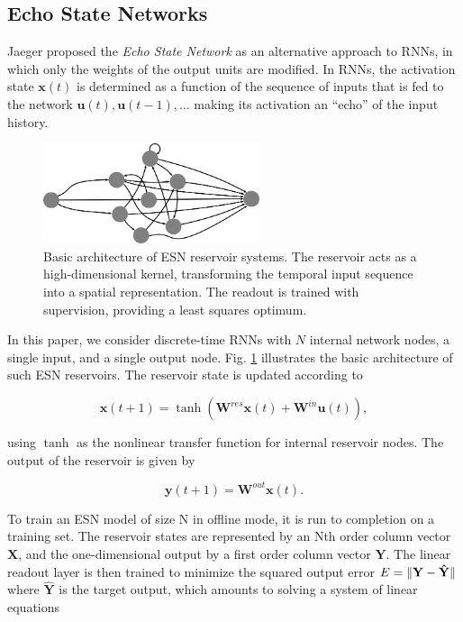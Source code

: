 \subsection{Echo State Networks}

Jaeger proposed the \textit{Echo State Network} \cite{jaeger_echo_2001} as an
alternative approach to RNNs, in which only the weights of the output units are
modified. In RNNs, the activation state $\mathbf{x}(t)$ is determined as a
function of the sequence of inputs that is fed to the network $\mathbf{u}(t),
\mathbf{u}(t-1), \ldots$ making its activation an ``echo'' of the input history.

\begin{figure}[H]
  \centering
  \includegraphics[width=2.5in]{img/esn.png}
  \caption{
    Basic architecture of ESN reservoir systems. The reservoir acts as a
high-dimensional kernel, transforming the temporal input sequence into a spatial
representation. The readout is trained with supervision, providing a least
squares optimum.
  }
  \label{esn}
\end{figure}

In this paper, we consider discrete-time RNNs with $N$ internal network nodes, a
single input, and a single output node. Fig. \ref{esn} illustrates the basic
architecture of such ESN reservoirs. The reservoir state is updated according to

\begin{equation}
  \mathbf{x}(t + 1) =
    \tanh(\mathbf{W}^{res}\mathbf{x}(t)
        + \mathbf{W}^{in}\mathbf{u}(t)),
  \label{xt}
\end{equation}

\noindent using $\tanh$ as the nonlinear transfer function for internal
reservoir nodes. The output of the reservoir is given by

\begin{equation}
  \mathbf{y}(t + 1) =
    \mathbf{W}^{out}\mathbf{x}(t).
  \label{yt}
\end{equation}

To train an ESN model of size N in offline mode, it is run to completion on a
training set. The reservoir states are represented by an Nth order column vector
$\mathbf{X}$, and the one-dimensional output by a first order column vector
$\mathbf{Y}$. The linear readout layer is then trained to minimize the squared
output error $E = \Vert \mathbf{Y} - \mathbf{\hat{Y}} \Vert$ where
$\mathbf{\hat{Y}}$ is the target output, which amounts to solving a system of
linear equations

